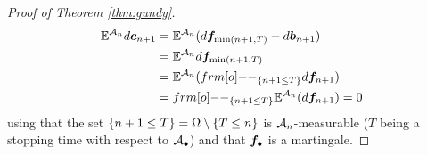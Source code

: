 \begin{proof}[Proof of Theorem \ref{thm:gundy}]
  \begin{equation*}
    \begin{aligned}
      \E^{\mc{A}_{n}} d\mb{c}_{n+1}
      &= \E^{\mc{A}_{n}} (d\mb{f}_{\min(n+1,T)} - d\mb{b}_{n+1}) \\
      &= \E^{\mc{A}_{n}} d\mb{f}_{\min(n+1,T)} \\
      &= \E^{\mc{A}_{n}} (\1_{\{n+1 \leq T\}} d\mb{f}_{n+1}) \\
      &= \1_{\{n+1 \leq T\}}\E^{\mc{A}_{n}} (d\mb{f}_{n+1}) = 0
    \end{aligned}
  \end{equation*}
  using that the set $\{n+1 \leq T\} = \Omega \setminus \{T \leq n\}$ is $\mathcal{A}_{n}$-measurable ($T$ being a stopping time with respect to $\mathcal{A}_{\bullet}$) and that $\bm{f}_{\bullet}$ is a martingale.


\end{proof}
